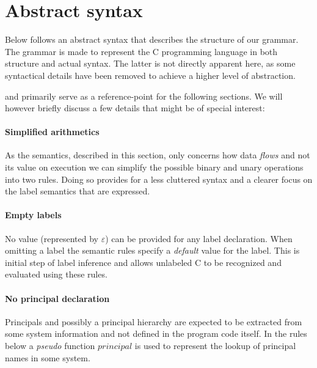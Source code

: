 \section{Abstract syntax}
Below follows an abstract syntax that describes the structure of our grammar.
The grammar is made to represent the C programming language in both structure and actual syntax.
The latter is not directly apparent here, as some syntactical details have been removed to achieve a higher level of abstraction.

 and  primarily serve as a reference-point for the following sections.
We will however briefly discuss a few details that might be of special interest:

\paragraph{Simplified arithmetics}
As the semantics, described in this section, only concerns how data \textit{flows} and not its value on execution we can simplify the possible binary and unary operations into two rules.
Doing so provides for a less cluttered syntax and a clearer focus on the label semantics that are expressed.

\paragraph{Empty labels}
No value (represented by $\varepsilon$) can be provided for any label declaration.
When omitting a label the semantic rules specify a \textit{default} value for the label.
This is initial step of label inference and allows unlabeled C to be recognized and evaluated using these rules.

\paragraph{No principal declaration}
Principals and possibly a principal hierarchy are expected to be extracted from some system information and not defined in the program code itself.
In the rules below a \textit{pseudo} function $principal$ is used to represent the lookup of principal names in some system.

